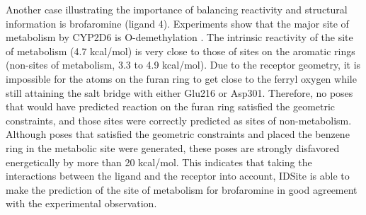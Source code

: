 Another case illustrating the importance of balancing reactivity and structural information is brofaromine (ligand 4).
Experiments show that the major site of metabolism by CYP2D6 is O-demethylation \cite{feifel1993role}.
The intrinsic reactivity of the site of metabolism (4.7 kcal/mol) is very close to those of sites on the aromatic rings (non-sites of metabolism, 3.3 to 4.9 kcal/mol).
Due to the receptor geometry, it is impossible for the atoms on the furan ring to get close to the ferryl oxygen while still attaining the salt bridge with either Glu216 or Asp301.
Therefore, no poses that would have predicted reaction on the furan ring satisfied the geometric constraints, and those sites were correctly predicted as sites of non-metabolism. 
Although poses that satisfied the geometric constraints and placed the benzene ring in the metabolic site were generated, these poses are strongly disfavored energetically by more than 20 kcal/mol. 
This indicates that taking the interactions between the ligand and the receptor into account, IDSite is able to make the prediction of the site of metabolism for brofaromine in good agreement with the experimental observation.

